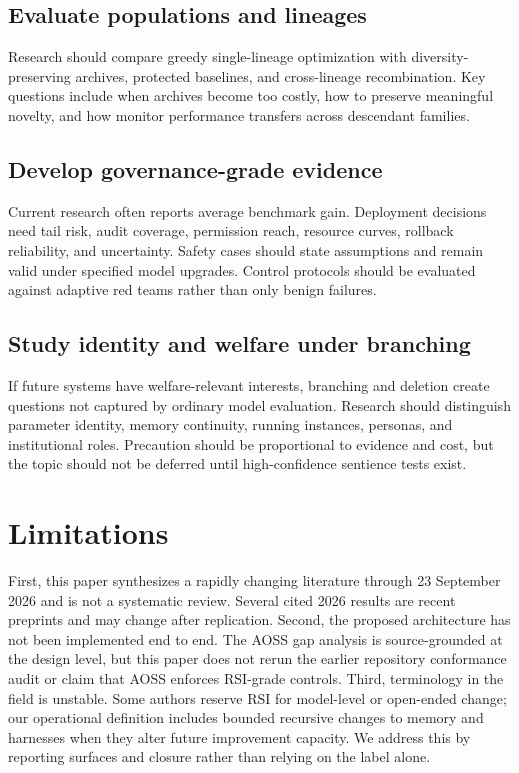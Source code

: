 \documentclass[11pt,a4paper]{article}
\begin{document}
\subsection{Evaluate populations and lineages}

Research should compare greedy single-lineage optimization with diversity-preserving archives, protected baselines, and cross-lineage recombination. Key questions include when archives become too costly, how to preserve meaningful novelty, and how monitor performance transfers across descendant families.

\subsection{Develop governance-grade evidence}

Current research often reports average benchmark gain. Deployment decisions need tail risk, audit coverage, permission reach, resource curves, rollback reliability, and uncertainty. Safety cases should state assumptions and remain valid under specified model upgrades. Control protocols should be evaluated against adaptive red teams rather than only benign failures.

\subsection{Study identity and welfare under branching}

If future systems have welfare-relevant interests, branching and deletion create questions not captured by ordinary model evaluation. Research should distinguish parameter identity, memory continuity, running instances, personas, and institutional roles. Precaution should be proportional to evidence and cost, but the topic should not be deferred until high-confidence sentience tests exist.

\section{Limitations}

First, this paper synthesizes a rapidly changing literature through 23 September 2026 and is not a systematic review. Several cited 2026 results are recent preprints and may change after replication. Second, the proposed architecture has not been implemented end to end. The AOSS gap analysis is source-grounded at the design level, but this paper does not rerun the earlier repository conformance audit or claim that AOSS enforces RSI-grade controls. Third, terminology in the field is unstable. Some authors reserve RSI for model-level or open-ended change; our operational definition includes bounded recursive changes to memory and harnesses when they alter future improvement capacity. We address this by reporting surfaces and closure rather than relying on the label alone.
\end{document}
